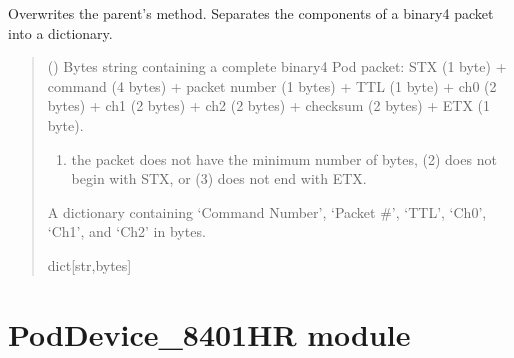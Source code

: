 \documentclass[letterpaper,10pt,english]{sphinxmanual}
\begin{document}
\begin{fulllineitems}
\begin{fulllineitems}
\label{\detokenize{PodDevice_8206HR:PodDevice_8206HR.POD_8206HR.UnpackPODpacket_Binary}}
\pysigstartsignatures
{}
\pysigstopsignatures
\sphinxAtStartPar
Overwrites the parent’s method. Separates the components of a binary4 packet into a dictionary.
\begin{quote}\begin{description}
\sphinxAtStartPar
{} () \textendash{} Bytes string containing a complete binary4 Pod packet:  STX (1 byte)                  + command (4 bytes) + packet number (1 bytes) + TTL (1 byte) + ch0 (2 bytes)                 + ch1 (2 bytes) + ch2 (2 bytes) + checksum (2 bytes) + ETX (1 byte).

\sphinxAtStartPar
{} \textendash{} \begin{enumerate}
%
\item {} 
\sphinxAtStartPar
the packet does not have the minimum number of bytes, (2) does not begin                 with STX, or (3) does not end with ETX.

\end{enumerate}


\sphinxAtStartPar
A dictionary containing ‘Command Number’, ‘Packet \#’, ‘TTL’, ‘Ch0’, ‘Ch1’,                 and ‘Ch2’ in bytes.

\sphinxAtStartPar
dict{[}str,bytes{]}

\end{description}\end{quote}

\end{fulllineitems}


\end{fulllineitems}


\sphinxstepscope


\section{PodDevice\_8401HR module}
\label{\detokenize{PodDevice_8401HR:module-PodDevice_8401HR}}\label{\detokenize{PodDevice_8401HR:poddevice-8401hr-module}}\label{\detokenize{PodDevice_8401HR::doc}}
\end{document}
